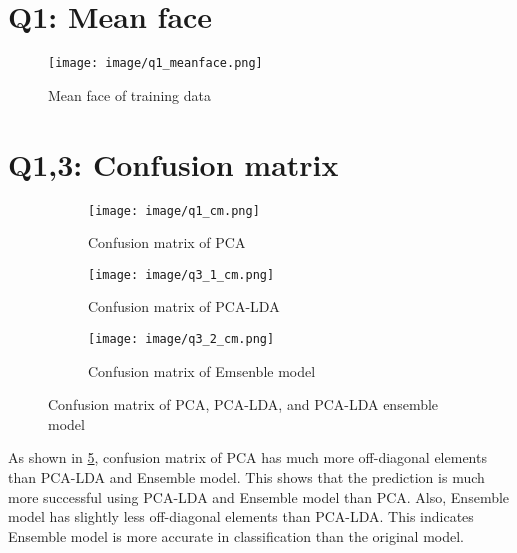 \section{Q1: Mean face}
\label{subsec:Q1_meanface}
\begin{figure}[htbp]
	\centering
	\texttt{[image: image/q1\_meanface.png]} 
	\caption{Mean face of training data}
	\label{fig:q1_meanface}
\end{figure}

\section{Q1,3: Confusion matrix}
\label{subsec:Q13_cm}
\begin{figure}[htbp]
	\centering
        \begin{subfigure}[t]{0.3\linewidth}
		\centering
	\texttt{[image: image/q1\_cm.png]}
	\caption{Confusion matrix of PCA}
	\label{fig:q1_cm}
        \end{subfigure}
    \quad
        \begin{subfigure}[t]{0.3\linewidth}
        \centering
        \texttt{[image: image/q3\_1\_cm.png]} %
	\caption{Confusion matrix of PCA-LDA}
	\label{fig:q3_1_cm}
        \end{subfigure}
    \quad
        \begin{subfigure}[t]{0.3\linewidth}
        \centering
        \texttt{[image: image/q3\_2\_cm.png]} %
	\caption{Confusion matrix of Emsenble model}
	\label{fig:q3_2_cm}
        \end{subfigure}
    \caption{Confusion matrix of PCA, PCA-LDA, and PCA-LDA ensemble model}
    \label{fig:cm}
\end{figure}

As shown in \cref{fig:cm}, confusion matrix of PCA has much more off-diagonal elements than PCA-LDA and Ensemble model. This shows that the prediction is much more successful using PCA-LDA and Ensemble model than PCA. Also, Ensemble model has slightly less off-diagonal elements than PCA-LDA. This indicates Ensemble model is more accurate in classification than the original model. 

